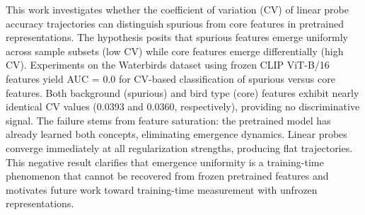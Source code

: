 
This work investigates whether the coefficient of variation (CV) of linear probe accuracy trajectories can distinguish spurious from core features in pretrained representations. The hypothesis posits that spurious features emerge uniformly across sample subsets (low CV) while core features emerge differentially (high CV). Experiments on the Waterbirds dataset using frozen CLIP ViT-B/16 features yield AUC = 0.0 for CV-based classification of spurious versus core features. Both background (spurious) and bird type (core) features exhibit nearly identical CV values (0.0393 and 0.0360, respectively), providing no discriminative signal. The failure stems from feature saturation: the pretrained model has already learned both concepts, eliminating emergence dynamics. Linear probes converge immediately at all regularization strengths, producing flat trajectories. This negative result clarifies that emergence uniformity is a training-time phenomenon that cannot be recovered from frozen pretrained features and motivates future work toward training-time measurement with unfrozen representations.

